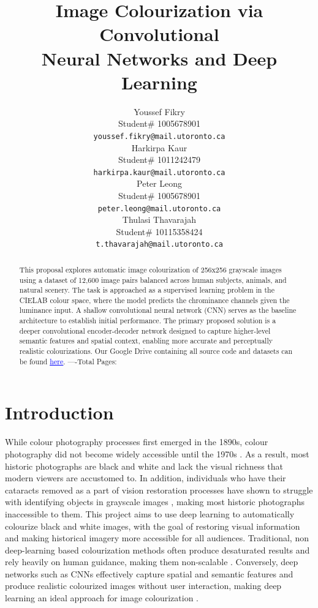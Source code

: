 \documentclass{article} %
\title{Image Colourization via Convolutional \\
Neural Networks and Deep Learning}
\author{Youssef Fikry  \\
Student\# 1005678901\\
\texttt{youssef.fikry@mail.utoronto.ca} \\
\And Harkirpa Kaur  \\
Student\# 1011242479 \\
\texttt{harkirpa.kaur@mail.utoronto.ca} \\
\AND
Peter Leong \\
Student\# 1005678901 \\
\texttt{peter.leong@mail.utoronto.ca} \\
\And
Thulasi Thavarajah \\
Student\# 10115358424 \\
\texttt{t.thavarajah@mail.utoronto.ca} \\
\AND
}
\begin{document}
\maketitle

\begin{abstract}
This proposal explores automatic image colourization of 256x256 grayscale images using a dataset of 12,600 image pairs balanced across human subjects, animals, and natural scenery. 
The task is approached as a supervised learning problem in the CIELAB colour space, where the model predicts the chrominance channels given the luminance input. A shallow convolutional 
neural network (CNN) serves as the baseline architecture to establish initial performance. The primary proposed solution is a deeper convolutional encoder-decoder network designed to 
capture higher-level semantic features and spatial context, enabling more accurate and perceptually realistic colourizations. Our Google Drive containing all source code and datasets 
can be found \href{https://drive.google.com/drive/folders/1cV1NhlQ8UTk_CgJdwhqeRu0z5xE85ZsI?usp=sharing}{\textcolor{blue}{\uline{here}}}.
----Total Pages: \pageref{last_page}
\end{abstract}


\section{Introduction}

While colour photography processes first emerged in the 1890s, colour photography did not become widely accessible until the 1970s \citep{scienceandmediamuseum2020}. As a result, 
most historic photographs are black and white and lack the visual richness that modern viewers are accustomed to. In addition, individuals who have their cataracts 
removed as a part of vision restoration processes have shown to struggle with identifying objects in grayscale images \citet{vogelsang2024impact}, making most historic photographs 
inaccessible to them. This project aims to use deep learning to automatically colourize black and white images, with the goal of restoring visual information and 
making historical imagery more accessible for all audiences. Traditional, non deep-learning based colourization methods often produce desaturated results and rely 
heavily on human guidance, making them non-scalable \citep{cheng2016deepcolorization}. Conversely, deep networks such as CNNs effectively capture spatial and semantic features and produce 
realistic colourized images without user interaction, making deep learning an ideal approach for image colourization \citep{zhang2016colorful}.
\end{document}
